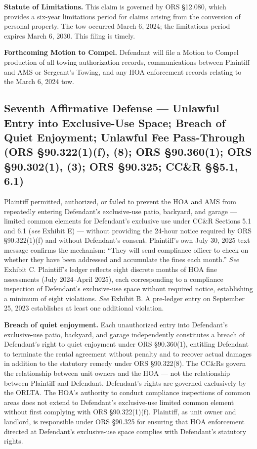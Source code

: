 \documentclass[12pt,letterpaper]{article}
\begin{document}
\textbf{Statute of Limitations.} This claim is governed by ORS \S12.080, which provides a six-year limitations period for claims arising from the conversion of personal property. The tow occurred March 6, 2024; the limitations period expires March 6, 2030. This filing is timely.

\textbf{Forthcoming Motion to Compel.} Defendant will file a Motion to Compel production of all towing authorization records, communications between Plaintiff and AMS or Sergeant's Towing, and any HOA enforcement records relating to the March 6, 2024 tow.

\subsection{Seventh Affirmative Defense --- Unlawful Entry into Exclusive-Use Space; Breach of Quiet Enjoyment; Unlawful Fee Pass-Through (ORS \S90.322(1)(f), (8); ORS \S90.360(1); ORS \S90.302(1), (3); ORS \S90.325; CC\&R \S\S5.1, 6.1)}

Plaintiff permitted, authorized, or failed to prevent the HOA and AMS from repeatedly entering Defendant's exclusive-use patio, backyard, and garage --- limited common elements for Defendant's exclusive use under CC\&R Sections 5.1 and 6.1 (\textit{see} Exhibit E) --- without providing the 24-hour notice required by ORS \S90.322(1)(f) and without Defendant's consent. Plaintiff's own July 30, 2025 text message confirms the mechanism: ``They will send compliance officer to check on whether they have been addressed and accumulate the fines each month.'' \textit{See} Exhibit C. Plaintiff's ledger reflects eight discrete months of HOA fine assessments (July 2024--April 2025), each corresponding to a compliance inspection of Defendant's exclusive-use space without required notice, establishing a minimum of eight violations. \textit{See} Exhibit B. A pre-ledger entry on September 25, 2023 establishes at least one additional violation.

\textbf{Breach of quiet enjoyment.} Each unauthorized entry into Defendant's exclusive-use patio, backyard, and garage independently constitutes a breach of Defendant's right to quiet enjoyment under ORS \S90.360(1), entitling Defendant to terminate the rental agreement without penalty and to recover actual damages in addition to the statutory remedy under ORS \S90.322(8). The CC\&Rs govern the relationship between unit owners and the HOA --- not the relationship between Plaintiff and Defendant. Defendant's rights are governed exclusively by the ORLTA. The HOA's authority to conduct compliance inspections of common areas does not extend to Defendant's exclusive-use limited common element without first complying with ORS \S90.322(1)(f). Plaintiff, as unit owner and landlord, is responsible under ORS \S90.325 for ensuring that HOA enforcement directed at Defendant's exclusive-use space complies with Defendant's statutory rights.
\end{document}
